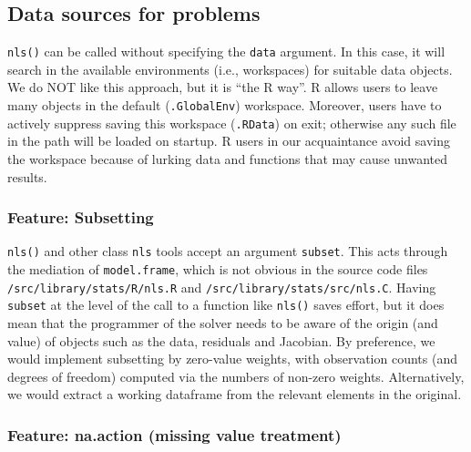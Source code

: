 \subsection{Data sources for problems}\label{data-sources-for-problems}

\texttt{nls()} can be called without specifying the \texttt{data} argument. In this case, it will
search in the available environments (i.e., workspaces) for suitable data objects.
We do NOT like this approach, but it is ``the R way''. R allows users to leave many
objects in the default (\texttt{.GlobalEnv}) workspace. Moreover, users have to actively
suppress saving this workspace (\texttt{.RData}) on exit; otherwise any such file in
the path will be loaded on startup. R users in our
acquaintance avoid saving the workspace because of lurking data and
functions that may cause unwanted results.

\subsubsection{Feature: Subsetting}\label{feature-subsetting}

\texttt{nls()} and other class \texttt{nls} tools accept an argument \texttt{subset}. This acts through
the mediation of \texttt{model.frame}, which is not obvious in the
source code files
\texttt{/src/library/stats/R/nls.R} and
\texttt{/src/library/stats/src/nls.C}.
Having \texttt{subset} at the level of the call to a function like
\texttt{nls()} saves effort, but it does mean that the programmer of the
solver needs to be aware of the
origin (and value) of objects such as the data, residuals and Jacobian.
By preference,
we would implement subsetting by zero-value weights, with observation counts
(and degrees of freedom) computed via the numbers of non-zero weights. Alternatively,
we would extract a working dataframe from the relevant elements in the original.

\subsubsection{Feature: na.action (missing value treatment)}\label{feature-na.action-missing-value-treatment}

